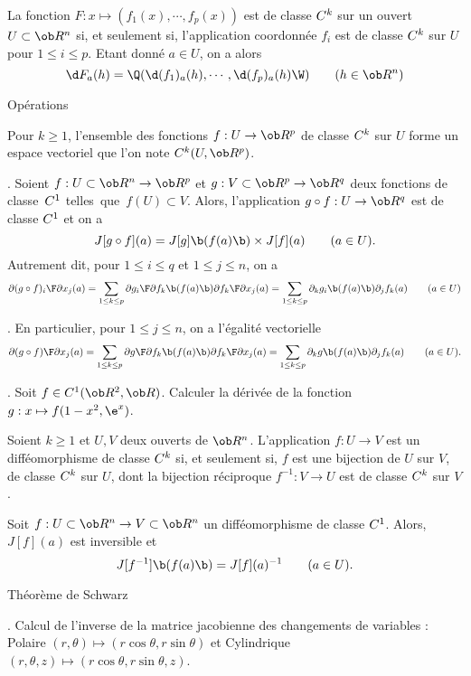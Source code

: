 \Propriete []  La fonction $F:x\mapsto(f_1(x),\cdots,f_p(x))$ est de classe $\sc C^k$ sur un ouvert $U\subset\ob R^n$ si, et seulement si, 
l'application coordonn\'ee $f_i$ est de classe $\sc C^k$ sur $U$ pour $1\le i\le p$. 
Etant donn\'e $a\in U$, on a alors 
$$
	\d F_a(h)=\Q(\d(f_1)_a(h),\cdots,\d(f_p)_a(h)\W)\qquad(h\in\ob R^n)
$$ 

\Concept [] Op\'erations

\Propriete []  Pour $k\ge1$, l'ensemble des fonctions $f:U\to\ob R^p$ 
de classe $\sc C^k$ sur $U$ forme un espace vectoriel que l'on note $\sc C^k(U,\ob R^p)$. 
\bigskip

\Theoreme . Soient $f:U\subset\ob R^n\to\ob R^p$ et $g:V\subset\ob R^p\to\ob R^q$ 
deux fonctions de classe~$\sc C^1$ telles~que~$f(U)\subset V$. Alors, l'application $g\circ f:U\to\ob R^q$ 
est de classe $\sc C^1$ et on a 
$$
J[g\circ f](a)=J[g]\b(f(a)\b)\times J[f](a)\qquad(a\in U). 
$$ 
Autrement dit, pour $1\le i\le q$ et $1\le j\le n$, on a 
$$
{\partial (g\circ f)_i\F\partial x_j}(a)=\sum_{1\le k\le p}{\partial g_i\F\partial f_k}\b(f(a)\b){\partial f_k\F\partial x_j}(a)
=\sum_{1\le k\le p}\partial_k g_i\b(f(a)\b)\partial_j f_k(a)\qquad(a\in U)
$$

\Remarque. En particulier, pour $1\le j\le n$, on a l'\'egalit\'e vectorielle 
$$
{\partial(g\circ f)\F\partial x_j}(a)
=\sum_{1\le k\le p}{\partial g\F\partial f_k}\b(f(a)\b){\partial f_k\F\partial x_j}(a)
=\sum_{1\le k\le p}\partial_k g\b(f(a)\b)\partial_j f_k(a)\qquad(a\in U). 
$$

\Exemple.  Soit $f\in\sc C^1(\ob R^2,\ob R)$. Calculer la d\'eriv\'ee 
de la fonction $g:x\mapsto f(1-x^2,\e^x)$. 
\bigskip

\Definition []  Soient $k\ge1$ et $U,V$ deux ouverts de $\ob R^n$. 
L'application $f:U\to V$ est un diff\'eomorphisme de classe $\sc C^k$ si, 
et seulement si, $f$ est une bijection de $U$ sur $V$, 
de classe $\sc C^k$ sur $U$, 
dont la bijection r\'eciproque $f^{-1}:V\to U$ est de classe $\sc C^k$ sur $V$. 
\bigskip

\Propriete []  Soit $f:U\subset\ob R^n\to V\subset\ob R^n$ 
un diff\'eomorphisme de classe $\sc C^1$. Alors, $J[f](a)$ est inversible et 
$$
J[f^{-1}]\b(f(a)\b)=J[f](a)^{-1}\qquad(a\in U).
$$ 


\Concept [] Th\'eor\`eme de Schwarz

\Exemple.  Calcul de l'inverse de la matrice jacobienne des changements de variables : 
Polaire $(r,\theta)\mapsto(r\cos\theta,r\sin\theta)$ et Cylindrique $(r,\theta,z)\mapsto(r\cos\theta,r\sin\theta,z)$.  
\bigskip

